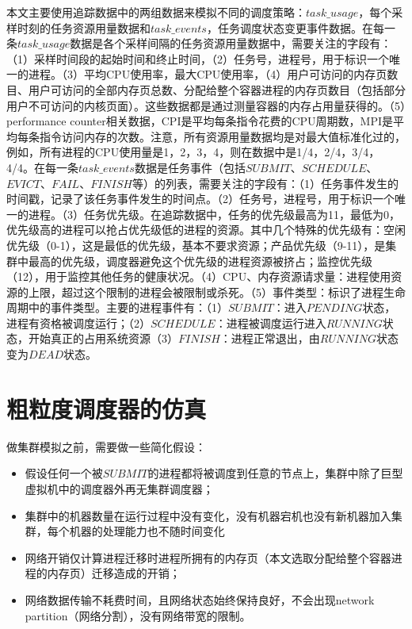 本文主要使用追踪数据中的两组数据来模拟不同的调度策略：$task\_usage$，每个采样时刻的任务资源用量数据和$task\_events$，任务调度状态变更事件数据。在每一条$task\_usage$数据是各个采样间隔的任务资源用量数据中，需要关注的字段有：（1）采样时间段的起始时间和终止时间，（2）任务号，进程号，用于标识一个唯一的进程。（3）平均CPU使用率，最大CPU使用率，（4）用户可访问的内存页数目、用户可访问的全部内存页总数、分配给整个容器进程的内存页数目（包括部分用户不可访问的内核页面）。这些数据都是通过测量容器的内存占用量获得的。（5）performance counter相关数据，CPI是平均每条指令花费的CPU周期数，MPI是平均每条指令访问内存的次数。注意，所有资源用量数据均是对最大值标准化过的，例如，所有进程的CPU使用量是1，2，3，4，则在数据中是1/4，2/4，3/4，4/4。在每一条$task\_events$数据是任务事件（包括$SUBMIT$、$SCHEDULE$、$EVICT$、$FAIL$、$FINISH$等）的列表，需要关注的字段有：（1）任务事件发生的时间戳，记录了该任务事件发生的时间点。（2）任务号，进程号，用于标识一个唯一的进程。（3）任务优先级。在追踪数据中，任务的优先级最高为11，最低为0，优先级高的进程可以抢占优先级低的进程的资源。其中几个特殊的优先级有：空闲优先级（0-1），这是最低的优先级，基本不要求资源；产品优先级（9-11），是集群中最高的优先级，调度器避免这个优先级的进程资源被挤占；监控优先级（12），用于监控其他任务的健康状况。（4）CPU、内存资源请求量：进程使用资源的上限，超过这个限制的进程会被限制或杀死。（5）事件类型：标识了进程生命周期中的事件类型。主要的进程事件有：（1）$SUBMIT$：进入$PENDING$状态，进程有资格被调度运行；（2）$SCHEDULE$：进程被调度运行进入$RUNNING$状态，开始真正的占用系统资源（3）$FINISH$：进程正常退出，由$RUNNING$状态变为$DEAD$状态。

\section{粗粒度调度器的仿真}
做集群模拟之前，需要做一些简化假设：
\begin{itemize}
  \item 假设任何一个被$SUBMIT$的进程都将被调度到任意的节点上，集群中除了巨型虚拟机中的调度器外再无集群调度器；
  \item 集群中的机器数量在运行过程中没有变化，没有机器宕机也没有新机器加入集群，每个机器的处理能力也不随时间变化
  \item 网络开销仅计算进程迁移时进程所拥有的内存页（本文选取分配给整个容器进程的内存页）迁移造成的开销；
  \item 网络数据传输不耗费时间，且网络状态始终保持良好，不会出现network partition（网络分割），没有网络带宽的限制。

\end{itemize}

